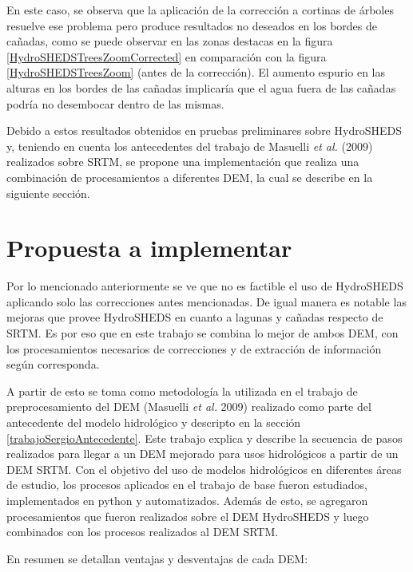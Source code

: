 \documentclass[10pt,a4paper, twoside]{report}
\begin{document}
En este caso, se observa que la aplicación de la corrección a cortinas de árboles resuelve ese problema pero produce resultados no deseados en los bordes de cañadas, como se puede observar en las zonas destacas en la figura \ref{HydroSHEDSTreesZoomCorrected} en comparación con la figura \ref{HydroSHEDSTreesZoom} (antes de la corrección). El aumento espurio en las alturas en los bordes de las cañadas implicaría que el agua fuera de las cañadas podría no desembocar dentro de las mismas.

Debido a estos resultados obtenidos en pruebas preliminares sobre HydroSHEDS y, teniendo en cuenta los antecedentes del trabajo de Masuelli \textit{et al.} (2009) realizados sobre SRTM, se propone una implementación que realiza una combinación de procesamientos a diferentes DEM, la cual se describe en la siguiente sección.

\section{Propuesta a implementar}

Por lo mencionado anteriormente se ve que no es factible el uso de HydroSHEDS aplicando solo las correcciones antes mencionadas. De igual manera es notable las mejoras que provee HydroSHEDS en cuanto a lagunas y cañadas respecto de SRTM. Es por eso que en este trabajo se combina lo mejor de ambos DEM, con los procesamientos necesarios de correcciones y de extracción de información según corresponda.

A partir de esto se toma como metodología la utilizada en el trabajo de preprocesamiento del DEM (Masuelli \textit{et al.} 2009) realizado como parte del antecedente del modelo hidrológico y descripto en la sección \ref{trabajoSergioAntecedente}. Este trabajo explica y describe la secuencia de pasos realizados para llegar a un DEM mejorado para usos hidrológicos a partir de un DEM SRTM. Con el objetivo del uso de modelos hidrológicos en diferentes áreas de estudio, los procesos aplicados en el trabajo de base fueron estudiados, implementados en python y automatizados. Además de esto, se agregaron procesamientos que fueron realizados sobre el DEM HydroSHEDS y luego combinados con los procesos realizados al DEM SRTM.


En resumen se detallan ventajas y desventajas de cada DEM:
\end{document}
